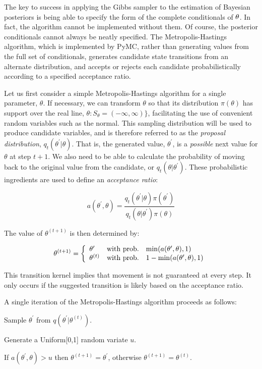 The key to success in applying the Gibbs sampler to the estimation of Bayesian posteriors is being able to specify the form of the complete conditionals of ${\bf \theta}$. In fact, the algorithm cannot be implemented without them. Of course, the posterior conditionals cannot always be neatly specified. The Metropolis-Hastings algorithm, which is implemented by PyMC, rather than generating values from the full set of conditionals, generates candidate state transitions from an alternate distribution, and accepts or rejects each candidate probabilistically according to a specified acceptance ratio.

Let us first consider a simple Metropolis-Hastings algorithm for a single parameter, $\theta$. If necessary, we can transform $\theta$ so that its distribution $\pi(\theta)$ has support over the real line, $\theta:S_{\theta} = (-\infty,\infty)\}$, facilitating the use of convenient random variables such as the normal. This sampling distribution will be used to produce candidate variables, and is therefore referred to as the \emph{proposal distribution}, $q_t(\theta^{\prime} | \theta)$. That is, the generated value, $\theta^{\prime}$, is a \emph{possible} next value for $\theta$ at step $t+1$. We also need to be able to calculate the probability of moving back to the original value from the candidate, or $q_t(\theta | \theta^{\prime})$. These probabilistic ingredients are used to define an \emph{acceptance ratio}:

\[
a(\theta^{\prime},\theta) = \frac{q_t(\theta^{\prime} | \theta) \pi(\theta^{\prime})}{q_t(\theta | \theta^{\prime}) \pi(\theta)}
\]

\noindent The value of $\theta^{(t+1)}$ is then determined by:

\[
\theta^{(t+1)} = \left\{\begin{array}{l@{\quad \mbox{with prob.} \quad}l}\theta^{\prime} & \min(a(\theta^{\prime},\theta),1) \\ \theta^{(t)} & 1 - \min(a(\theta^{\prime},\theta),1) \end{array}\right.
\]

\noindent This transition kernel implies that movement is not guaranteed at every step. It only occurs if the suggested transition is likely based on the acceptance ratio.

A single iteration of the Metropolis-Hastings algorithm proceeds as follows:

\begin{list}{}
{}
\item Sample $\theta^{\prime}$ from $q(\theta^{\prime} | \theta^{(t)})$.
\item Generate a Uniform[0,1] random variate $u$.
\item If $a(\theta^{\prime},\theta) > u$ then $\theta^{(t+1)} = \theta^{\prime}$, otherwise $\theta^{(t+1)} = \theta^{(t)}$.
\end{list}

